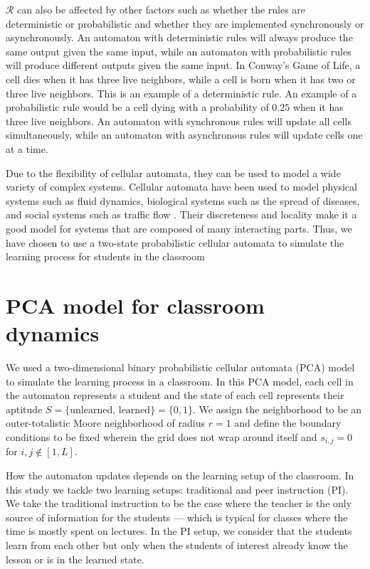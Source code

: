 $\mathcal{R}$ can also be affected by other factors such as whether the rules are deterministic or probabilistic and whether they are implemented synchronously or asynchronously. 
An automaton with deterministic rules will always produce the same output given the same input, while an automaton with probabilistic rules will produce different outputs given the same input. 
In Conway's Game of Life, a cell dies when it has three live neighbors, while a cell is born when it has two or three live neighbors. 
This is an example of a deterministic rule. An example of a probabilistic rule would be a cell dying with a probability of $0.25$ when it has three live neighbors. 
An automaton with synchronous rules will update all cells simultaneously, while an automaton with asynchronous rules will update cells one at a time.


Due to the flexibility of cellular automata, they can be used to model a wide variety of complex systems.
Cellular automata have been used to model physical systems such as fluid dynamics, biological systems such as the spread of diseases, and social systems such as traffic flow \cite{louis2018probabilistic}.
Their discreteness and locality make it a good model for systems that are composed of many interacting parts.
Thus, we have chosen to use a two-state probabilistic cellular automata to simulate the learning process for students in the classroom


\section{PCA model for classroom dynamics}
We used a two-dimensional binary probabilistic cellular automata (PCA) model to simulate the learning process in a classroom. 
In this PCA model, each cell in the automaton represents a student and the state of each cell represents their aptitude $S=\lbrace\text{unlearned, learned}\rbrace=\lbrace 0,1 \rbrace$. 
We assign the neighborhood to be an outer-totalistic Moore neighborhood of radius $r=1$ and define the boundary conditions to be fixed wherein the grid does not wrap around itself and $s_{i,j} = 0$ for ${i,j \notin [1,L]}$.

How the automaton updates depends on the learning setup of the classroom. 
In this study we tackle two learning setups: traditional and peer instruction (PI). 
We take the traditional instruction to be the case where the teacher is the only source of information for the students --- which is typical for classes where the time is mostly spent on lectures. 
In the PI setup, we consider that the students learn from each other but only when the students of interest already know the lesson or is in the learned state.


